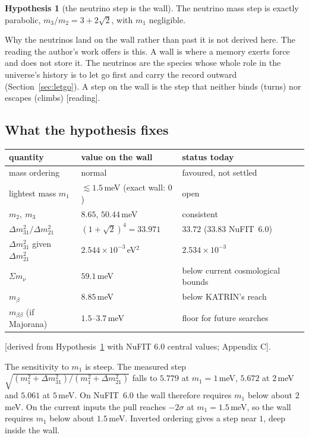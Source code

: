 \documentclass[11pt]{article}
\theoremstyle{definition}\newtheorem{hypothesis}{Hypothesis}\newtheorem{prediction}{Prediction}
\theoremstyle{remark}\newtheorem{remark}[theorem]{Remark}
\newcommand{\grade}[1]{\textsf{\small[#1]}}
\begin{document}
\begin{hypothesis}[the neutrino step is the wall]\label{hyp:mass}
The neutrino mass step is exactly parabolic, $m_3/m_2=3+2\sqrt2$, with $m_1$ negligible.
\end{hypothesis}

Why the neutrinos land on the wall rather than past it is not derived here. The reading the author's work offers is this. A wall is where a memory exerts force and does not store it. The neutrinos are the species whose whole role in the universe's history is to let go first and carry the record outward (Section~\ref{sec:letgo}). A step on the wall is the step that neither binds (turns) nor escapes (climbs) \grade{reading}.

\subsection{What the hypothesis fixes}
\begin{center}\begin{tabular}{lll}\toprule
quantity & value on the wall & status today\\\midrule
mass ordering & normal & favoured, not settled\\
lightest mass $m_1$ & $\lesssim1.5$\,meV (exact wall: $0$) & open\\
$m_2,\ m_3$ & $8.65$, $50.44$\,meV & consistent\\
$\Delta m^2_{31}/\Delta m^2_{21}$ & $(1+\sqrt2)^4=33.971$ & $33.72$ ($33.83$ NuFIT~6.0)\\
$\Delta m^2_{31}$ given $\Delta m^2_{21}$ & $2.544\times10^{-3}$\,eV$^2$ & $2.534\times10^{-3}$\\
$\Sigma m_\nu$ & $59.1$\,meV & below current cosmological bounds\\
$m_\beta$ & $8.85$\,meV & below KATRIN's reach\\
$m_{\beta\beta}$ (if Majorana) & $1.5$--$3.7$\,meV & floor for future searches\\\bottomrule\end{tabular}\end{center}
\grade{derived from Hypothesis~\ref{hyp:mass} with NuFIT 6.0 central values; Appendix C}.

The sensitivity to $m_1$ is steep. The measured step $\sqrt{(m_1^2+\Delta m^2_{31})/(m_1^2+\Delta m^2_{21})}$ falls to $5.779$ at $m_1=1$\,meV, $5.672$ at $2$\,meV and $5.061$ at $5$\,meV. On NuFIT~6.0 the wall therefore requires $m_1$ below about $2$\,meV. On the current inputs the pull reaches $-2\sigma$ at $m_1=1.5$\,meV, so the wall requires $m_1$ below about $1.5$\,meV. Inverted ordering gives a step near $1$, deep inside the wall.
\end{document}

